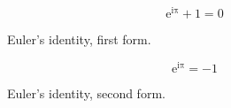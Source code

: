 \documentclass{article}
\begin{document}
\begin{figure}
	\ContinuedFloat*
	\[ \mathrm{e^{i \pi}} + 1 = 0 \]
	\caption{Euler's identity, first form.}
\end{figure}
\lipsum[4]
\begin{figure}
	\ContinuedFloat
	\[ \mathrm{e^{i \pi}} = -1 \]
	\caption{Euler's identity, second form.}
\end{figure}
\end{document}
